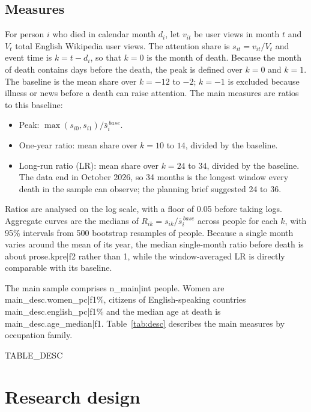 \documentclass[11pt,a4paper]{article}
\begin{document}
\subsection{Measures}
For person $i$ who died in calendar month $d_i$, let $v_{it}$ be user views in month $t$ and $V_t$ total English Wikipedia user views. The attention share is $s_{it} = v_{it} / V_t$ and event time is $k = t - d_i$, so that $k = 0$ is the month of death. Because the month of death contains days before the death, the peak is defined over $k = 0$ and $k = 1$. The baseline is the mean share over $k = -12$ to $-2$; $k = -1$ is excluded because illness or news before a death can raise attention. The main measures are ratios to this baseline:
\begin{itemize}
\item Peak: $\max(s_{i0}, s_{i1}) / \bar s_i^{\,base}$.
\item One-year ratio: mean share over $k = 10$ to $14$, divided by the baseline.
\item Long-run ratio (LR): mean share over $k = 24$ to $34$, divided by the baseline. The data end in October 2026, so 34 months is the longest window every death in the sample can observe; the planning brief suggested 24 to 36.
\end{itemize}
Ratios are analysed on the log scale, with a floor of 0.05 before taking logs. Aggregate curves are the medians of $R_{ik} = s_{ik} / \bar s_i^{\,base}$ across people for each $k$, with 95\% intervals from 500 bootstrap resamples of people. Because a single month varies around the mean of its year, the median single-month ratio before death is about {{prose.kpre|f2}} rather than 1, while the window-averaged LR is directly comparable with its baseline.

The main sample comprises {{n_main|int}} people. Women are {{main_desc.women_pc|f1}}\%, citizens of English-speaking countries {{main_desc.english_pc|f1}}\% and the median age at death is {{main_desc.age_median|f1}}. Table~\ref{tab:desc} describes the main measures by occupation family.

{{TABLE_DESC}}

\section{Research design}\label{sec:design}
\end{document}
